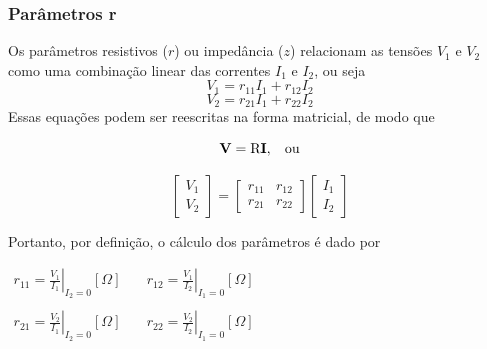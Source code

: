 \documentclass{article}
\numberwithin{equation}{section}
\begin{document}
\begin{center}
\end{center}

\subsubsection{Parâmetros r}
\label{subsubsec:quadripolosr}
Os parâmetros resistivos ($r$) ou impedância ($z$) relacionam as tensões $V_{1}$ e $V_{2}$ como uma combinação linear das correntes $I_{1}$ e $I_{2}$, ou seja
\begin{equation*}
    V_{1}=r_{11}I_{1}+r_{12}I_{2}
\end{equation*}
\begin{equation*}
    V_{2}=r_{21}I_{1}+r_{22}I_{2}
\end{equation*}
Essas equações podem ser reescritas na forma matricial, de modo que

\begin{equation*}
    \textbf{V}=\text{R}\textbf{I}, \hspace{0.3cm} \text{ou}
\end{equation*}

\begin{equation}
    \begin{bmatrix}
        V_{1} \\
        V_{2}
    \end{bmatrix}
    = %
    \begin{bmatrix}
        r_{11} & r_{12} \\
        r_{21} & r_{22}
    \end{bmatrix}
    \begin{bmatrix}
        I_{1} \\
        I_{2}
    \end{bmatrix}
\end{equation}

Portanto, por definição, o cálculo dos parâmetros é dado por
\begin{center}
    $\begin{matrix} %
            r_{11}=\displaystyle\left.\frac{V_{1}}{I_{1}}\right|_{I_{2}=0} [\Omega] & \quad r_{12}=\displaystyle\left.\frac{V_{1}}{I_{2}}\right|_{I_{1}=0} [\Omega]\\ \\
            r_{21}=\displaystyle\left.\frac{V_{2}}{I_{1}}\right|_{I_{2}=0} [\Omega] & \quad  r_{22}=\displaystyle\left.\frac{V_{2}}{I_{2}}\right|_{I_{1}=0} [\Omega]
    \end{matrix}$
\end{center}
\end{document}
